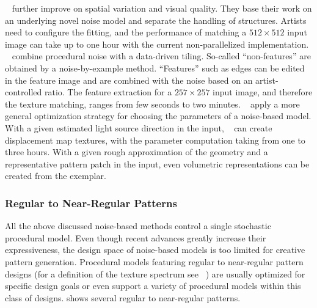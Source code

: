 {\citeauthor*{guingo_2017_btm}~\cite{guingo_2017_btm} further improve on spatial variation and visual quality. They base their work on an underlying novel noise model and separate the handling of structures. Artists need to configure the fitting, and the performance of matching a $512\times512$ input image can take up to one hour with the current non-parallelized implementation. \citeauthor*{kang_2017_fpt}~\cite{kang_2017_fpt} combine procedural noise with a data-driven tiling. So-called ``non-features'' are obtained by a noise-by-example method. ``Features'' such as edges can be edited in the feature image and are combined with the noise based on an artist-controlled ratio. The feature extraction for a $257\times257$ input image, and therefore the texture matching, ranges from few seconds to two minutes. \citeauthor*{gilet_2010_ias}~\cite{gilet_2010_ias} apply a more general optimization strategy for choosing the parameters of a noise-based model. With a given estimated light source direction in the input, \citeauthor*{gilet_2010_ias}~\cite{gilet_2010_ias} can create displacement map textures, with the parameter computation taking from one to three hours. With a given rough approximation of the geometry and a representative pattern patch in the input, even volumetric representations can be created from the exemplar.}



\subsubsection{Regular to Near-Regular Patterns}
\label{subsubsec:analysis_distribution_and_repetition_regular}

All the above discussed noise-based methods control a single stochastic procedural model. Even though recent advances greatly increase their expressiveness, the design space of noise-based models is too limited for creative pattern generation. Procedural models featuring regular to near-regular pattern designs (for a definition of the texture spectrum see \citeauthor{lin_2006_qeo}~\cite{lin_2006_qeo}) are usually optimized for specific design goals or even support a variety of procedural models within this class of designs.  shows several regular to near-regular patterns.

